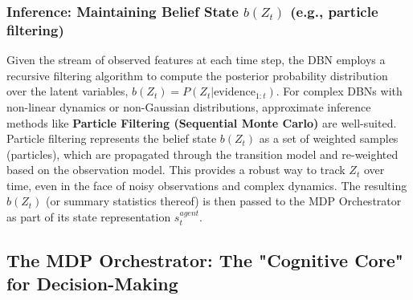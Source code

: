 \documentclass[11pt]{article}
\begin{document}
\subsubsection{Inference: Maintaining Belief State $b(Z_t)$ (e.g., particle filtering)}
\label{sssec:dbn_inference}
Given the stream of observed features at each time step, the DBN employs a recursive filtering algorithm to compute the posterior probability distribution over the latent variables, $b(Z_t) = P(Z_t | \text{evidence}_{1:t})$. For complex DBNs with non-linear dynamics or non-Gaussian distributions, approximate inference methods like \textbf{Particle Filtering (Sequential Monte Carlo)} are well-suited. Particle filtering represents the belief state $b(Z_t)$ as a set of weighted samples (particles), which are propagated through the transition model and re-weighted based on the observation model. This provides a robust way to track $Z_t$ over time, even in the face of noisy observations and complex dynamics. The resulting $b(Z_t)$ (or summary statistics thereof) is then passed to the MDP Orchestrator as part of its state representation $s_t^{agent}$.

\subsection{The MDP Orchestrator: The "Cognitive Core" for Decision-Making}
\label{ssec:mdp_orchestrator}
\end{document}
